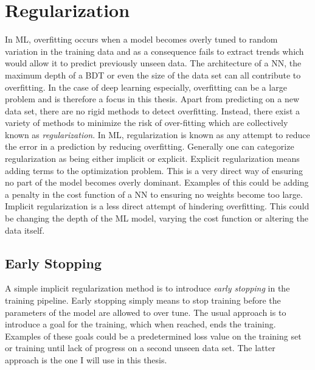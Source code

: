 \section{Regularization}\label{sec:Regularization}
In \ac{ML}, overfitting occurs when a model becomes overly tuned to random variation in the training data and as a consequence 
fails to extract trends which would allow it to predict previously unseen data. The architecture of a \ac{NN}, 
the maximum depth of a \ac{BDT} or even the size of the data set can all contribute to overfitting. In the 
case of deep learning especially, overfitting can be a large problem and is therefore a focus in this thesis. Apart 
from predicting on a new data set, there are no rigid methods to detect overfitting. Instead, there exist 
a variety of methods to minimize the risk of over-fitting which are collectively known as \emph{regularization}. In \ac{ML}, 
regularization is known as any attempt to reduce the error in a prediction by reducing overfitting. Generally one can categorize
regularization as being either implicit or explicit. Explicit regularization means adding terms to the optimization 
problem. This is a very direct way of ensuring no part of the model becomes overly dominant. Examples of this 
could be adding a penalty in the cost function of a \ac{NN} to ensuring no weights become too large. Implicit
regularization is a less direct attempt of hindering overfitting. This could be changing the depth of the \ac{ML} model,
varying the cost function or altering the data itself.
\subsection{Early Stopping}\label{subsec:EarlyStopping}
A simple implicit regularization method is to introduce \emph{early stopping} in the training pipeline. Early stopping 
simply means to stop training before the parameters of the model are allowed to over tune. The usual approach 
is to introduce a goal for the training, which when reached, ends the training. Examples of these goals could be a 
predetermined loss value on the training set or training until lack of progress on a second unseen data set. The latter
approach is the one I will use in this thesis. 
